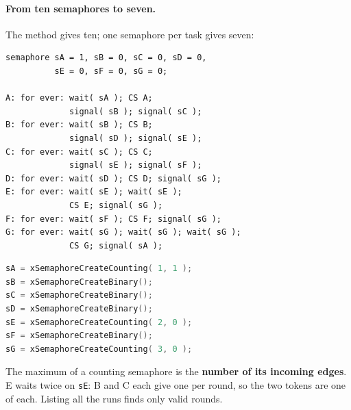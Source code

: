 \paragraph{From ten semaphores to seven.} The method gives ten; one semaphore per task gives seven:
\par\noindent\begin{minipage}[t]{0.55\textwidth}
\begin{lstlisting}[basicstyle=\ttfamily\scriptsize]
semaphore sA = 1, sB = 0, sC = 0, sD = 0,
          sE = 0, sF = 0, sG = 0;

A: for ever: wait( sA ); CS A;
             signal( sB ); signal( sC );
B: for ever: wait( sB ); CS B;
             signal( sD ); signal( sE );
C: for ever: wait( sC ); CS C;
             signal( sE ); signal( sF );
D: for ever: wait( sD ); CS D; signal( sG );
E: for ever: wait( sE ); wait( sE );
             CS E; signal( sG );
F: for ever: wait( sF ); CS F; signal( sG );
G: for ever: wait( sG ); wait( sG ); wait( sG );
             CS G; signal( sA );
\end{lstlisting}
\end{minipage}\hfill
\begin{minipage}[t]{0.42\textwidth}
\begin{lstlisting}[language=C, showstringspaces=false, basicstyle=\ttfamily\scriptsize]
sA = xSemaphoreCreateCounting( 1, 1 );
sB = xSemaphoreCreateBinary();
sC = xSemaphoreCreateBinary();
sD = xSemaphoreCreateBinary();
sE = xSemaphoreCreateCounting( 2, 0 );
sF = xSemaphoreCreateBinary();
sG = xSemaphoreCreateCounting( 3, 0 );
\end{lstlisting}
\raggedright The maximum of a counting semaphore is the \textbf{number of its incoming edges}. E waits twice on \texttt{sE}: B and C each give one per round, so the two tokens are one of each. Listing all the runs finds only valid rounds.
\end{minipage}

